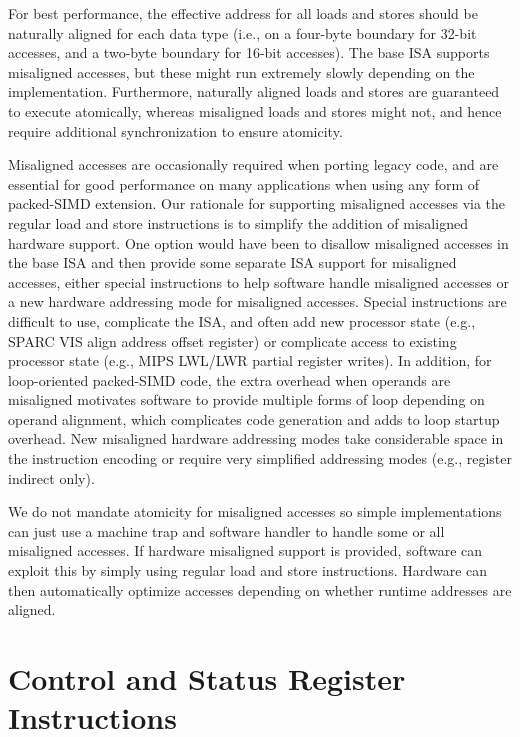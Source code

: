 For best performance, the effective address for all loads and stores
should be naturally aligned for each data type (i.e., on a four-byte
boundary for 32-bit accesses, and a two-byte boundary for 16-bit
accesses).  The base ISA supports misaligned accesses, but these might
run extremely slowly depending on the implementation.  Furthermore,
naturally aligned loads and stores are guaranteed to execute
atomically, whereas misaligned loads and stores might not, and hence
require additional synchronization to ensure atomicity.

\begin{commentary}
Misaligned accesses are occasionally required when porting legacy
code, and are essential for good performance on many applications when
using any form of packed-SIMD extension.  Our rationale for supporting
misaligned accesses via the regular load and store instructions is to
simplify the addition of misaligned hardware support.  One option
would have been to disallow misaligned accesses in the base ISA and
then provide some separate ISA support for misaligned accesses, either
special instructions to help software handle misaligned accesses or a
new hardware addressing mode for misaligned accesses.  Special
instructions are difficult to use, complicate the ISA, and often add
new processor state (e.g., SPARC VIS align address offset register) or
complicate access to existing processor state (e.g., MIPS LWL/LWR
partial register writes).  In addition, for loop-oriented packed-SIMD
code, the extra overhead when operands are misaligned motivates
software to provide multiple forms of loop depending on operand
alignment, which complicates code generation and adds to loop startup
overhead.  New misaligned hardware addressing modes take considerable
space in the instruction encoding or require very simplified
addressing modes (e.g., register indirect only).

We do not mandate atomicity for misaligned accesses so simple
implementations can just use a machine trap and software handler to
handle some or all misaligned accesses.  If hardware misaligned support is
provided, software can exploit this by simply using regular load and
store instructions.  Hardware can then automatically optimize accesses
depending on whether runtime addresses are aligned.
\end{commentary}

\section{Control and Status Register Instructions}
\label{sec:csrinsts}

